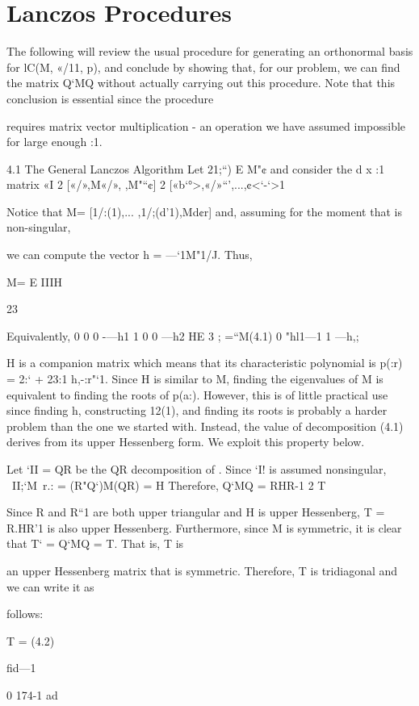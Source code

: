 \chapter{Lanczos Procedures}

The following will review the usual procedure for generating an orthonormal basis for
lC(M, «/11, p), and conclude by showing that, for our problem, we can find the matrix Q‘MQ without
actually carrying out this procedure. Note that this conclusion is essential since the procedure

requires matrix vector multiplication - an operation we have assumed impossible for large enough :1.

4.1 The General Lanczos Algorithm
Let 21;“) E M"¢ and consider the d x :1 matrix
«I 2 [«/»,M«/»,  ,M"“¢] 2 [«b‘°>,«/»“’,...,¢<‘-‘>1

Notice that M\II = [1/:(1),... ,1/;(d'1),Md¢r] and, assuming for the moment that  is non-singular,

we can compute the vector h = —\II‘1M"1/J. Thus,

M\II = \II[e2,. . . ,e,1, —h] E IIIH


23

Equivalently,
0 0  0 -—h1
1 0  0 —h2
HE   3 ; =\II“M\II (4.1)
0 "hl1—1
1 —h,;

H is a companion matrix which means that its characteristic polynomial is p(:r) = 2:‘ + 23:1 h,-:r"‘1.
Since H is similar to M, ﬁnding the eigenvalues of M is equivalent to ﬁnding the roots of p(a:).
However, this is of little practical use since ﬁnding h, constructing 12(1), and ﬁnding its roots is
probably a harder problem than the one we started with. Instead, the value of decomposition (4.1)
derives from its upper Hessenberg form. We exploit this property below.

Let ‘II = QR be the QR decomposition of \II. Since ‘I! is assumed nonsingular,
~II;‘M~r.: = (R"Q‘)M(QR) = H
Therefore,
Q‘MQ = RHR-1 2 T

Since R and R“1 are both upper triangular and H is upper Hessenberg, T = R.HR'1 is also upper
Hessenberg. Furthermore, since M is symmetric, it is clear that T‘ = Q‘MQ = T. That is, T is

an upper Hessenberg matrix that is symmetric. Therefore, T is tridiagonal and we can write it as

follows:

T =    (4.2)

ﬁd—1

0  174-1 ad


